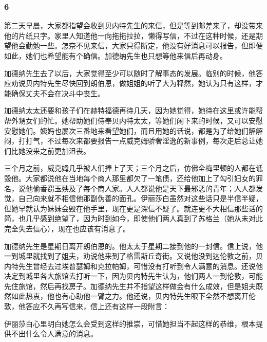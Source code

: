 \subsubsection*{6}

\par 第二天早晨，大家都指望会收到贝内特先生的来信，但是等到邮差来了，却没带来他的片纸只字。家里人知道他一向拖拖拉拉，懒得写信，不过在这种时候，还是期望他会勤勉一些。怎奈不见来信，大家只得断定，他没有好消息可以报告，但即便如此，她们也希望能有个确信。加德纳先生也只想等他来信后再动身。
\par 加德纳先生去了以后，大家觉得至少可以随时了解事态的发展。临别的时候，他答应劝说贝内特先生尽快回到朗伯恩，做姐姐的听了大为释然，她认为只有这样，才能确保丈夫不会在决斗中丧生。
\par 加德纳太太还要和孩子们在赫特福德再待几天，因为她觉得，她待在这里或许能帮帮外甥女们的忙。她帮助她们侍奉贝内特太太，等她们闲下来的时候，又可以安慰安慰她们。姨妈也屡次三番地来看望她们，而且用她的话说，都是为了给她们解解闷，打打气，不过每次来都要报告一点威克姆骄奢淫逸的新事例，每次走后总让她们比她没来之前更加沮丧。
\par 三个月之前，威克姆几乎被人们捧上了天；三个月之后，仿佛全梅里顿的人都在诋毁他。大家都说他在当地每个商人那里都欠了一笔债，还给他加上了勾引妇女的罪名，说他偷香窃玉殃及了每个商人家。人人都说他是天下最邪恶的青年；人人都发觉，自己向来就不相信他那副伪善的面孔。伊丽莎白虽然对这些话只是半信半疑，但她早就认为妹妹会毁在他手里，现在更是深信不疑了。就连更不大相信那些话的简，也几乎感到绝望了，因为时到如今，即使他们两人真到了苏格兰（她从未对此完全失去信心），现在也应该有消息了。
\par 加德纳先生是星期日离开朗伯恩的。他太太于星期二接到他的一封信。信上说，他一到城里就找到了姐夫，劝说他来到了格雷斯丘奇街。又说他没到达伦敦之前，贝内特先生曾经去过埃普瑟姆和克拉帕姆，可惜没有打听到令人满意的消息。还说他决定到城里各大旅馆去打听一下，因为贝内特先生认为，他们两人一到伦敦，可能先住旅馆，然后再找房子。加德纳先生并不指望这样做会有什么成效，但是姐夫既然如此热衷，他也有心助他一臂之力。他还说，贝内特先生眼下全然不想离开伦敦，他答应不久再写信来，信上还有这样一段附言：
\par 伊丽莎白心里明白她怎么会受到这样的推崇，可惜她担当不起这样的恭维，根本提供不出什么令人满意的消息。
